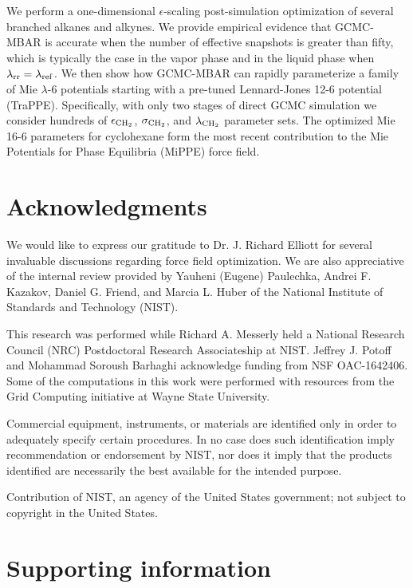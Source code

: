 \documentclass[journal=jced,manuscript=article]{achemso}
\begin{document}

We perform a one-dimensional $\epsilon$-scaling post-simulation optimization of several branched alkanes and alkynes. We provide empirical evidence that GCMC-MBAR is accurate when the number of effective snapshots is greater than fifty, which is typically the case in the vapor phase and in the liquid phase when $\lambda_{\rm rr} = \lambda_{\rm ref}$. We then show how GCMC-MBAR can rapidly parameterize a family of Mie $\lambda$-6 potentials starting with a pre-tuned Lennard-Jones 12-6 potential (TraPPE). Specifically, with only two stages of direct GCMC simulation we consider hundreds of $\epsilon_{\rm CH_2}$, $\sigma_{\rm CH_2}$, and $\lambda_{\rm CH_2}$ parameter sets. The optimized Mie 16-6 parameters for cyclohexane form the most recent contribution to the Mie Potentials for Phase Equilibria (MiPPE) force field.

\section*{Acknowledgments}

We would like to express our gratitude to Dr. J. Richard Elliott for several invaluable discussions regarding force field optimization. We are also appreciative of the internal review provided by Yauheni (Eugene) Paulechka, Andrei F. Kazakov, Daniel G. Friend, and Marcia L. Huber of the National Institute of Standards and Technology (NIST).

This research was performed while Richard A. Messerly held a National Research Council (NRC) Postdoctoral Research Associateship at NIST. Jeffrey J. Potoff and Mohammad Soroush Barhaghi acknowledge funding from NSF OAC-1642406. Some of the computations in this work were performed with resources from the Grid Computing initiative at Wayne State University. 

Commercial equipment, instruments, or materials are identified only in order to adequately specify certain procedures. In no case does such identification imply recommendation or endorsement by NIST, nor does it imply that the products identified are necessarily the best available for the intended purpose.

Contribution of NIST, an agency of the United States government; not subject to copyright in the United States.

\section*{Supporting information}
\end{document}
